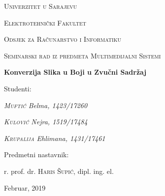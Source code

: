 \begin{titlepage}
	\centering
	{\scshape Univerzitet u Sarajevu \par}
	{\scshape Elektrotehnički Fakultet \par}
	{\scshape Odsjek za Računarstvo i Informatiku \par}
	\vspace{2cm}
	{\Large\scshape Seminarski rad iz predmeta Multimedijalni Sistemi\par}
	\vspace{2.5cm}
	{\huge\bfseries Konverzija Slika u Boji u Zvučni Sadržaj\par}
	\vspace{2.5cm}
	\Large Studenti: \par
	{\Large\itshape \textsc{Muftić} Belma, 1423/17260\par}
	{\Large\itshape \textsc{Kulović} Nejra, 1519/17484\par}
	{\Large\itshape \textsc{Krupalija} Ehlimana, 1431/17461\par}
	\vfill
	Predmetni nastavnik:\par
	r. prof. dr. \textsc{Haris Šupić}, dipl. ing. el.
	\vfill
	{\large Februar, 2019\par}
\end{titlepage}

